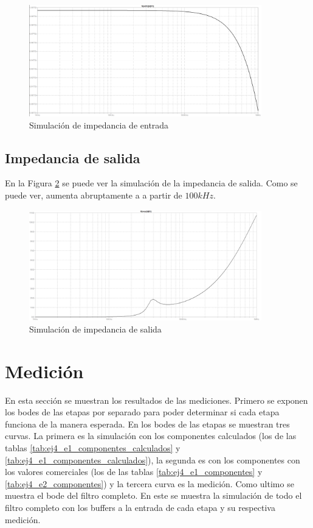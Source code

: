 \begin{figure}[h!]                                                
    \centering\includegraphics[width=0.9\textwidth]{../Ex4/Resources/ej4_impedancia.png}
    \caption{Simulación de impedancia de entrada}
    \label{ej4_simulacion_impedancia_entrada}
    \end{figure}



\subsection{Impedancia de salida}
En la Figura \ref{fig:ej4_impedancia_salida} se puede ver la simulación de la impedancia de salida. Como se puede ver, aumenta abruptamente a a partir de $100kHz$. 

\begin{figure}[h!]                                                
    \centering\includegraphics[width=0.9\textwidth]{../Ex4/Resources/ej4_impedancia_salida.png}
    \caption{Simulación de impedancia de salida}
    \label{fig:ej4_impedancia_salida}
    \end{figure}
    


\section{Medición}
En esta sección se muestran los resultados de las mediciones. Primero se exponen los bodes de las etapas por separado para poder determinar si cada etapa funciona de la manera esperada. En los bodes de las etapas se muestran tres curvas. La primera es la simulación con los componentes calculados (los de las tablas \ref{tab:ej4_e1_componentes_calculados} y \ref{tab:ej4_e1_componentes_calculados}), la segunda es con los componentes con los valores comerciales (los de las tablas \ref{tab:ej4_e1_componentes} y \ref{tab:ej4_e2_componentes}) y la tercera curva es la medición. Como ultimo se muestra el bode del filtro completo. En este se muestra la simulación de todo el filtro completo con los buffers a la entrada de cada etapa y su respectiva medición.  

